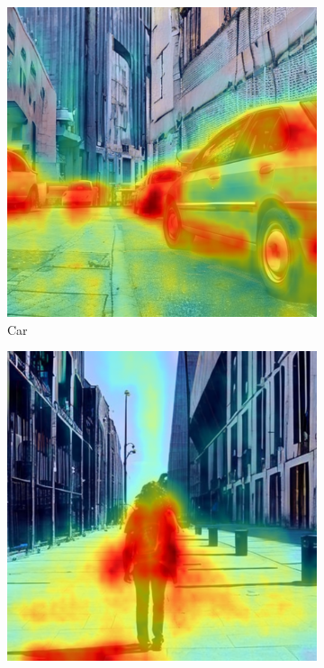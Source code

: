 \begin{figure}
\centering
  \begin{subfigure}{0.24\columnwidth}
   \includegraphics[width=\columnwidth]{img/4-experiments/example-linear-daam-overlay-car.png}
   \caption{Car}
   \label{subfig:dataset-example-car-daam-linear}
  \end{subfigure}
  \begin{subfigure}{0.24\columnwidth}
   \includegraphics[width=\columnwidth]{img/4-experiments/example-linear-daam-overlay-person.png}

\end{subfigure}
\end{figure}
